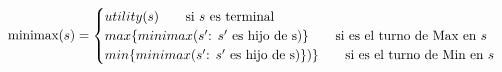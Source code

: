 \documentclass[preview]{standalone}
\begin{document}
\begin{align*}
\text{minimax($s$)} =  \begin{cases}
                                 utility(s) \qquad \text{si $s$ es terminal} \cr
                                 max\{minimax(\text{$s'$: $s'$ es hijo de }$s$)\}\qquad \text{si es el turno de Max en $s$} \cr
                                 min\{minimax(\text{$s'$: $s'$ es hijo de }$s$)\})\}\qquad \text{si es el turno de Min en $s$} \cr
                                 \end{cases}
\end{align*}
\end{document}
